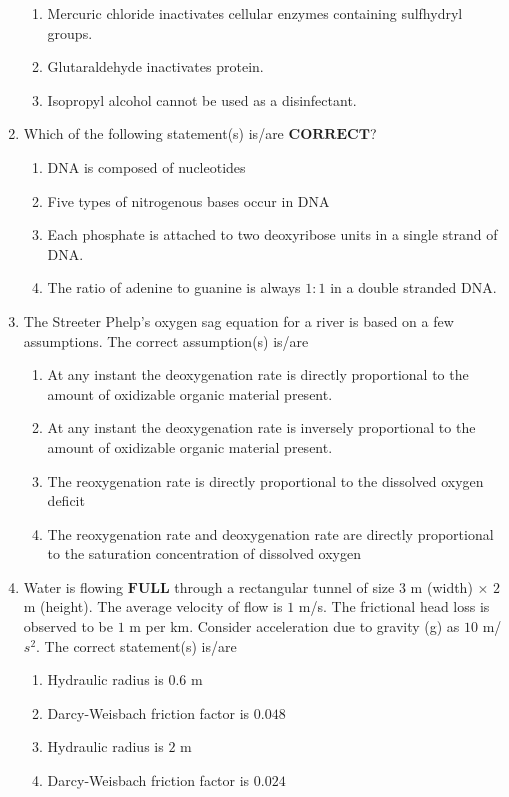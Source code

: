 \documentclass[journal]{IEEEtran}
\numberwithin{equation}{enumi}
\numberwithin{figure}{enumi}
\begin{document}
\begin{enumerate}[start=1, label={Q\arabic*.}]
\begin{enumerate}
  \item Mercuric chloride inactivates cellular enzymes containing sulfhydryl groups.
  \item Glutaraldehyde inactivates protein.
  \item Isopropyl alcohol cannot be used as a disinfectant.
  \end{enumerate}
  \vspace{0.1cm}
\item Which of the following statement(s) is/are $\mathbf{CORRECT}$?
\begin{enumerate}
  \item DNA is composed of nucleotides
  \item Five types of nitrogenous bases occur in DNA
  \item Each phosphate is attached to two deoxyribose units in a single strand of DNA.
  \item The ratio of adenine to guanine is always $1:1$ in a double stranded DNA.
  \end{enumerate}
  \newpage
\item The Streeter Phelp's oxygen sag equation for a river is based on a few assumptions.
The correct assumption(s) is/are
\begin{enumerate}
  \item At any instant the deoxygenation rate is directly proportional to the amount of
oxidizable organic material present. 
  \item At any instant the deoxygenation rate is inversely proportional to the amount of
oxidizable organic material present. 
  \item The reoxygenation rate is directly proportional to the dissolved oxygen deficit
  \item The reoxygenation rate and deoxygenation rate are directly proportional to the
saturation concentration of dissolved oxygen
  \end{enumerate}
\item Water is flowing $\mathbf{FULL}$ through a rectangular tunnel of size $3$ m (width) \(\times\) $2$ m (height).
The average velocity of flow is $1$ m/s. The frictional head loss is observed to be $1$ m per
km. Consider acceleration due to gravity (g) as $10$ m/$s^2$. The correct statement(s) is/are
\begin{enumerate}
  \item Hydraulic radius is $0.6$ m
  \item Darcy-Weisbach friction factor is $0.048$
  \item Hydraulic radius is $2$ m
  \item Darcy-Weisbach friction factor is $0.024$
  \end{enumerate}


\end{enumerate}
\end{document}
